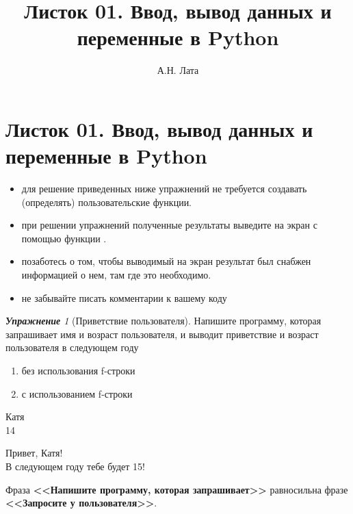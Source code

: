 \documentclass[a4,12pt]{article}
\title{Листок 01. Ввод, вывод данных и переменные в Python}
\author{А.Н. Лата}
\theoremstyle{remark}
\newtheorem{exercise}{\textbf{Упражнение}}[section]
\begin{document}


\section*{\centering Листок 01. Ввод, вывод данных и переменные в Python}

\begin{exercisenote}[title=Замечания]
\begin{itemize}
    \item для решение приведенных ниже упражнений не требуется создавать (определять) пользовательские функции.
    \item при решении упражнений полученные результаты выведите на экран с помощью функции {\color{blue}{print()}}.
    \item позаботесь о том, чтобы выводимый на экран результат был снабжен информацией о нем, там где это необходимо.
    \item не забывайте писать комментарии к вашему коду
\end{itemize}
\end{exercisenote}


\begin{exercise}[Приветствие пользователя]
Напишите программу, которая запрашивает имя и возраст пользователя, и выводит приветствие и возраст пользователя в следующем году
\begin{enumerate}[label=\textbf{\alph*)}]
    \item без использования f-строки
    \item с использованием f-строки
\end{enumerate}

\begin{inputformat}
Катя\\
14
\end{inputformat}
    
\begin{outputformat}
Привет, Катя!\\
В следующем году тебе будет 15!
\end{outputformat}

\begin{exercisecomment}
Фраза \textbf{<<Напишите программу, которая запрашивает>>} равносильна фразе \textbf{<<Запросите у пользователя>>}.
\end{exercisecomment}

\end{exercise}
\end{document}
